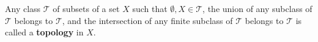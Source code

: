 Any class $\mathcal{T}$ of subsets of a set $X$ such that $\emptyset, X \in \mathcal{T}$, the union of any subclass of $\mathcal{T}$ belongs to $\mathcal{T}$, and the intersection of any finite subclass of $\mathcal{T}$ belongs to $\mathcal{T}$ is called a \textbf{topology} in $X$.
